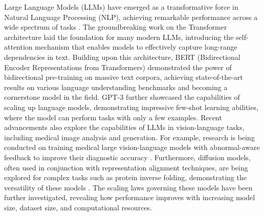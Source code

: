 Large Language Models (LLMs) have emerged as a transformative force in Natural Language Processing (NLP), achieving remarkable performance across a wide spectrum of tasks \cite{Vaswani2017}. The groundbreaking work on the Transformer architecture \cite{Vaswani2017} laid the foundation for many modern LLMs, introducing the self-attention mechanism that enables models to effectively capture long-range dependencies in text. Building upon this architecture, BERT (Bidirectional Encoder Representations from Transformers) demonstrated the power of bidirectional pre-training on massive text corpora, achieving state-of-the-art results on various language understanding benchmarks and becoming a cornerstone model in the field. GPT-3 further showcased the capabilities of scaling up language models, demonstrating impressive few-shot learning abilities, where the model can perform tasks with only a few examples.  Recent advancements also explore the capabilities of LLMs in vision-language tasks, including medical image analysis and generation. For example, research is being conducted on training medical large vision-language models with abnormal-aware feedback to improve their diagnostic accuracy \cite{zhou2025training}.  Furthermore, diffusion models, often used in conjunction with representation alignment techniques, are being explored for complex tasks such as protein inverse folding, demonstrating the versatility of these models \cite{wang2024diffusion}. The scaling laws governing these models have been further investigated, revealing how performance improves with increasing model size, dataset size, and computational resources.

